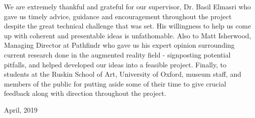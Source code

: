 
We are extremely thankful and grateful for our supervisor, Dr. Basil Elmasri who gave us timely advice, guidance and encouragement throughout the project despite the great technical challenge that was set. His willingness to help us come up with coherent and presentable ideas is unfathomable. Also to Matt Isherwood, Managing Director at Pathfindr who gave us his expert opinion surrounding current research done in the augmented reality field - signposting potential pitfalls, and helped developed our ideas into a feasible project. Finally, to students at the Ruskin School of Art, University of Oxford, museum staff, and members of the public for putting aside some of their time to give crucial feedback along with direction throughout the project.

\begin{flushright}
April, 2019
\end{flushright}
